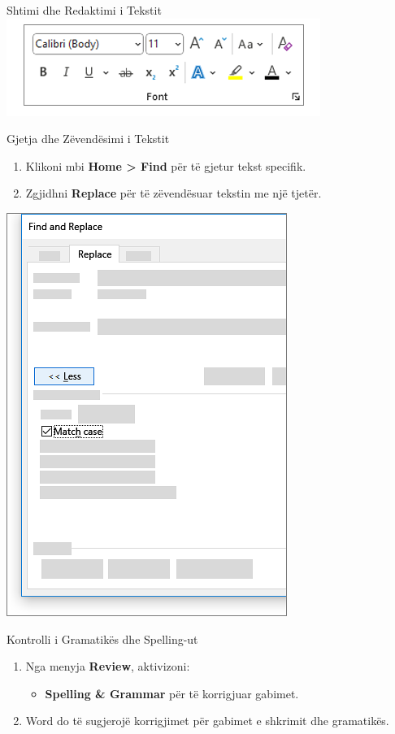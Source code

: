 \documentclass[
  ignorenonframetext,
]{beamer}
\providecommand{\tightlist}{%
  \setlength{\itemsep}{0pt}\setlength{\parskip}{0pt}}
\begin{document}
\begin{frame}{Shtimi dhe Redaktimi i Tekstit}
\label{shtimi-dhe-redaktimi-i-tekstit-1}
\includegraphics{./images/word19.png}
\end{frame}

\begin{frame}{Gjetja dhe Zëvendësimi i Tekstit}
\label{gjetja-dhe-zuxebvenduxebsimi-i-tekstit}
\begin{enumerate}
\item
  Klikoni mbi \textbf{Home \textgreater{} Find} për të gjetur tekst
  specifik.
\item
  Zgjidhni \textbf{Replace} për të zëvendësuar tekstin me një tjetër.
\end{enumerate}

\includegraphics{./images/word20.png}
\end{frame}

\begin{frame}{Kontrolli i Gramatikës dhe Spelling-ut}
\label{kontrolli-i-gramatikuxebs-dhe-spelling-ut}
\begin{enumerate}
\item
  Nga menyja \textbf{Review}, aktivizoni:

  \begin{itemize}
  \tightlist
  \item
    \textbf{Spelling \& Grammar} për të korrigjuar gabimet.
  \end{itemize}
\item
  Word do të sugjerojë korrigjimet për gabimet e shkrimit dhe
  gramatikës.
\end{enumerate}
\end{frame}
\end{document}
